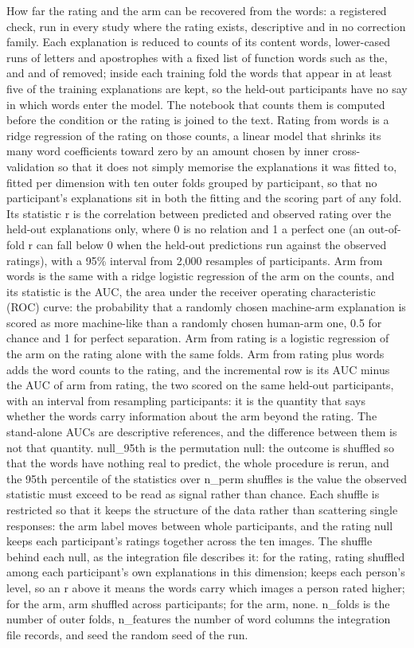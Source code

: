 \begin{table}[!h]
\centering
\caption{\label{tab:supp_text_recoverability}How far the rating and the arm can be recovered from the words: a registered check, run in every study where the rating exists, descriptive and in no correction family. Each explanation is reduced to counts of its content words, lower-cased runs of letters and apostrophes with a fixed list of function words such as the, and and of removed; inside each training fold the words that appear in at least five of the training explanations are kept, so the held-out participants have no say in which words enter the model. The notebook that counts them is computed before the condition or the rating is joined to the text. Rating from words is a ridge regression of the rating on those counts, a linear model that shrinks its many word coefficients toward zero by an amount chosen by inner cross-validation so that it does not simply memorise the explanations it was fitted to, fitted per dimension with ten outer folds grouped by participant, so that no participant's explanations sit in both the fitting and the scoring part of any fold. Its statistic r is the correlation between predicted and observed rating over the held-out explanations only, where 0 is no relation and 1 a perfect one (an out-of-fold r can fall below 0 when the held-out predictions run against the observed ratings), with a 95\% interval from 2,000 resamples of participants. Arm from words is the same with a ridge logistic regression of the arm on the counts, and its statistic is the AUC, the area under the receiver operating characteristic (ROC) curve: the probability that a randomly chosen machine-arm explanation is scored as more machine-like than a randomly chosen human-arm one, 0.5 for chance and 1 for perfect separation. Arm from rating is a logistic regression of the arm on the rating alone with the same folds. Arm from rating plus words adds the word counts to the rating, and the incremental row is its AUC minus the AUC of arm from rating, the two scored on the same held-out participants, with an interval from resampling participants: it is the quantity that says whether the words carry information about the arm beyond the rating. The stand-alone AUCs are descriptive references, and the difference between them is not that quantity. null\_95th is the permutation null: the outcome is shuffled so that the words have nothing real to predict, the whole procedure is rerun, and the 95th percentile of the statistics over n\_perm shuffles is the value the observed statistic must exceed to be read as signal rather than chance. Each shuffle is restricted so that it keeps the structure of the data rather than scattering single responses: the arm label moves between whole participants, and the rating null keeps each participant's ratings together across the ten images. The shuffle behind each null, as the integration file describes it: for the rating, rating shuffled among each participant's own explanations in this dimension; keeps each person's level, so an r above it means the words carry which images a person rated higher; for the arm, arm shuffled across participants; for the arm, none. n\_folds is the number of outer folds, n\_features the number of word columns the integration file records, and seed the random seed of the run.}

\end{table}
